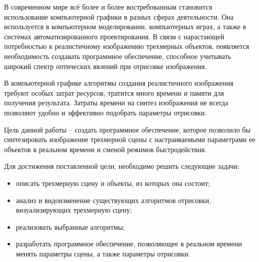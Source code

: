 \Introduction

В современном мире всё более и более востребованным становится использование компьютерной графики в разных сферах деятельности. Она используется в компьютерном моделировании, компьютерных играх, а также в системах автоматизированного проектирования. В связи с нарастающей потребностью к реалистичному изображению трехмерных объектов, появляется необходимость создавать программное обеспечение, способное учитывать широкий спектр оптических явлений при отрисовке изображения.

В компьютерной графике алгоритмы создания реалистичного изображения требуют особых затрат ресурсов, тратится много времени и памяти для получения результата. Затраты времени на синтез изображения не всегда позволяют удобно и эффективно подобрать параметры отрисовки.

Цель данной работы – создать программное обеспечение, которое позволило бы синтезировать изображение трехмерной сцены с настраиваемыми параметрами ее объектов в реальном времени и сменой режимов быстродействия.

Для достижения поставленной цели, необходимо решить следующие задачи:

\begin{itemize}
	\item описать трехмерную сцену и объекты, из которых она состоит;
	\item анализ и видоизменение существующих алгоритмов отрисовки, визуализирующих трехмерную сцену;
	\item реализовать выбранные алгоритмы;
	\item разработать программное обеспечение, позволяющее в реальном времени менять параметры сцены, а также параметры отрисовки.
\end{itemize}
